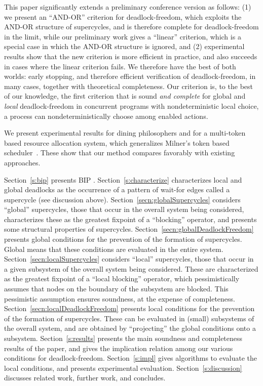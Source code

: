 This paper significantly extends a preliminary conference version \cite{FORTE13} as
follows: 
(1) we present an ``AND-OR'' criterion for deadlock-freedom, which exploits the AND-OR structure of supercycles, and is therefore complete for
deadlock-freedom in the limit, while our preliminary work \cite{FORTE13} gives a ``linear'' criterion, which is a special case in which the AND-OR structure is ignored, and
(2) experimental results show that the new criterion is more efficient
in practice, and also succeeds in cases where the linear criterion
fails.
We therefore have the best of both worlds: early stopping, and
therefore efficient verification of deadlock-freedom, in many cases,
together with theoretical completeness.
%
Our criterion is, to the best of our knowledge, the first criterion that is sound \emph{and complete} 
for global and \emph{local} deadlock-freedom in
concurrent programs with nondeterministic local choice, \ie a process can nondeterministically choose among enabled actions.

We present experimental results for dining philosophers and for a
multi-token based resource allocation system, which generalizes Milner's token based
scheduler~\cite{milner}.  These show that our method compares favorably with existing approaches.



Section~\ref{s:bip} presents BIP \cite{BliudzeS08}.  Section~\ref{s:characterize} characterizes local and global deadlocks as the occurrence of a pattern of wait-for
edges called a supercycle (see discussion above).   Section~\ref{secn:globalSupercycles} considers ``global''
supercycles, \ie those that occur in the overall system being considered, characterizes these as the greatest fixpoint of a ``blocking'' operator, and
presents some structural properties of supercycles. Section~\ref{secn:globalDeadlockFreedom} presents global conditions for the prevention of the
formation of supercycles. Global means that these conditions are evaluated in the entire system.  Section~\ref{secn:localSupercycles} considers
``local'' supercycles, \ie those that occur in a given subsystem of the overall system being considered.  These are characterized as the greatest
fixpoint of a ``local blocking'' operator, which pessimistically assumes that nodes on the boundary of the subsystem are blocked. This pessimistic
assumption ensures soundness, at the expense of completeness.  Section~\ref{secn:localDeadlockFreedom} presents local conditions for the prevention of
the formation of supercycles. These can be evaluated in (small) subsystems of the overall system, and are obtained by ``projecting'' the global
conditions onto a subsystem.  Section~\ref{s:results} presents the main soundness and completeness results of the paper, and gives the implication
relation among our various conditions for deadlock-freedom.  Section~\ref{s:impl} gives algorithms to evaluate the local conditions, and presents
experimental evaluation.  Section~\ref{s:discussion} discusses related work, further work, and concludes.
